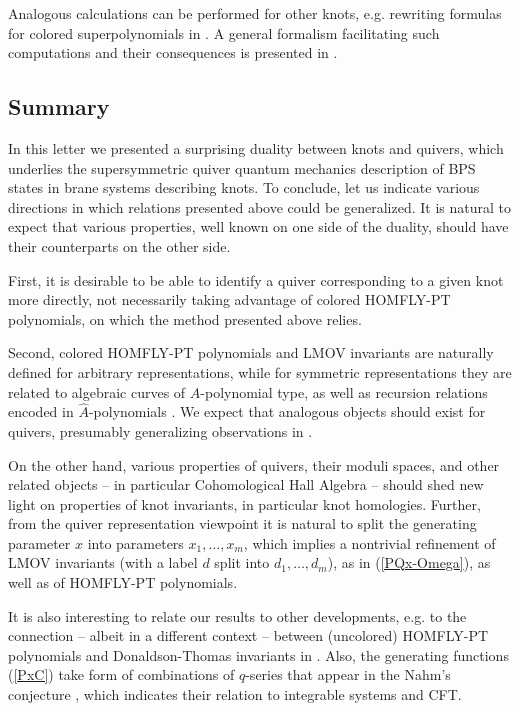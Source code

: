 \documentclass[
 reprint,
 amsmath,amssymb,
 aps,prl
]{revtex4-1}
\begin{document}
Analogous calculations can be performed for other knots, e.g. rewriting formulas for colored superpolynomials in \cite{FGSS}. A general formalism facilitating such computations and their consequences is presented in \cite{KRSS2}.




\subsection{Summary}

In this letter we presented a surprising duality between knots and quivers, which underlies the supersymmetric quiver quantum mechanics description of BPS states in brane systems describing knots. To conclude, let us indicate various directions in which relations presented above could be generalized. It is natural to expect that various properties, well known on one side of the duality, should have their counterparts on the other side. 

First, it is desirable to be able to identify a quiver corresponding to a given knot more directly, not necessarily taking advantage of colored HOMFLY-PT polynomials, on which the method presented above relies.

Second, colored HOMFLY-PT polynomials and LMOV invariants are naturally defined for arbitrary representations, while for symmetric representations they are related to algebraic curves of $A$-polynomial type, as well as recursion relations encoded in $\widehat{A}$-polynomials \cite{AVqdef,Garoufalidis:2015ewa,Kucharski:2016rlb}. We expect that analogous objects should exist for quivers, presumably generalizing observations in \cite{COM:8276935}. 

On the other hand, various properties of quivers, their moduli spaces, and other related objects -- in particular Cohomological Hall Algebra -- should shed new light on properties of knot invariants, in particular knot homologies. Further, from the quiver representation viewpoint it is natural to split the generating parameter $x$ into parameters $x_1,\ldots,x_m$, which implies a nontrivial refinement of LMOV invariants (with a label $d$ split into $d_1,\ldots,d_m$), as in (\ref{PQx-Omega}), as well as of HOMFLY-PT polynomials. 

It is also interesting to relate our results to other developments, e.g. to the connection -- albeit in a different context -- between (uncolored) HOMFLY-PT polynomials and Donaldson-Thomas invariants in \cite{Diaconescu-HOMFLY-DT}. Also, the generating functions (\ref{PxC}) take form of combinations of $q$-series that appear in the Nahm's conjecture \cite{Nahm}, which indicates their relation to integrable systems and CFT. 
\end{document}
